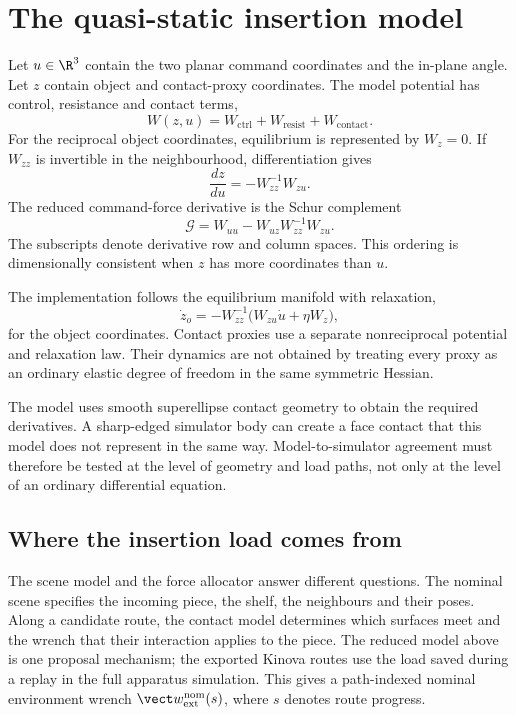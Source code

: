 \section{The quasi-static insertion model}

Let $u\in\R^3$ contain the two planar command coordinates and the in-plane angle. Let $z$ contain object and contact-proxy coordinates. The model potential has control, resistance and contact terms,
\begin{equation}
W(z,u)=W_{\mathrm{ctrl}}+W_{\mathrm{resist}}+W_{\mathrm{contact}}.
\end{equation}
For the reciprocal object coordinates, equilibrium is represented by $W_z=0$. If $W_{zz}$ is invertible in the neighbourhood, differentiation gives
\begin{equation}
\frac{dz}{du}=-W_{zz}^{-1}W_{zu}.
\end{equation}
The reduced command-force derivative is the Schur complement
\begin{equation}
\mathcal G=W_{uu}-W_{uz}W_{zz}^{-1}W_{zu}.
\label{eq:haptic-metric}
\end{equation}
The subscripts denote derivative row and column spaces. This ordering is dimensionally consistent when $z$ has more coordinates than $u$.

The implementation follows the equilibrium manifold with relaxation,
\begin{equation}
\dot z_o=-W_{zz}^{-1}\bigl(W_{zu}\dot u+\eta W_z\bigr),
\end{equation}
for the object coordinates. Contact proxies use a separate nonreciprocal potential and relaxation law. Their dynamics are not obtained by treating every proxy as an ordinary elastic degree of freedom in the same symmetric Hessian.

The model uses smooth superellipse contact geometry to obtain the required derivatives. A sharp-edged simulator body can create a face contact that this model does not represent in the same way. Model-to-simulator agreement must therefore be tested at the level of geometry and load paths, not only at the level of an ordinary differential equation.

\subsection{Where the insertion load comes from}
\label{sec:insertion-load-source}

The scene model and the force allocator answer different questions. The nominal scene specifies the incoming piece, the shelf, the neighbours and their poses. Along a candidate route, the contact model determines which surfaces meet and the wrench that their interaction applies to the piece. The reduced model above is one proposal mechanism; the exported Kinova routes use the load saved during a replay in the full apparatus simulation. This gives a path-indexed nominal environment wrench $\vect w_{\mathrm{ext}}^{\mathrm{nom}}(s)$, where $s$ denotes route progress.

